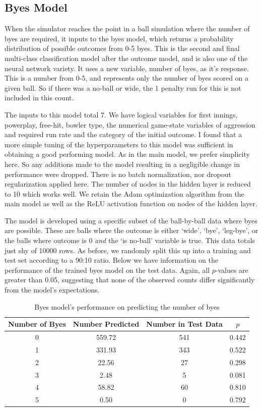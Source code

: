 \subsection{Byes Model}

When the simulator reaches the point in a ball simulation where the number of byes are required, it inputs to the byes model, which returns a probability distribution of possible outcomes from 0-5 byes. This is the second and final multi-class classification model after the outcome model, and is also one of the neural network variety. It uses a new variable, number of byes, as it's response. This is a number from 0-5, and represents only the number of byes scored on a given ball. So if there was a no-ball or wide, the 1 penalty run for this is not included in this count.

The inputs to this model total 7. We have logical variables for first innings, powerplay, free-hit, bowler type, the numerical game-state variables of aggression and required run rate and the category of the initial outcome. I found that a more simple tuning of the hyperparameters to this model was sufficient in obtaining a good performing model. As in the main model, we prefer simplicity here. So any additions made to the model resulting in a negligible change in performance were dropped. There is no batch normalization, nor dropout regularization applied here. The number of nodes in the hidden layer is reduced to 10 which works well. We retain the Adam optimization algorithm from the main model as well as the ReLU activation function on nodes of the hidden layer.

The model is developed using a specific subset of the ball-by-ball data where byes are possible. These are balls where the outcome is either `wide', `bye', `leg-bye', or the balls where outcome is 0 \textit{and} the `is no-ball' variable is true. This data totals just shy of 10000 rows. As before, we randomly split this up into a training and test set according to a 90:10 ratio. Below we have information on the performance of the trained byes model on the test data. Again, all $p$-values are greater than 0.05, suggesting that none of the observed counts differ significantly from the model's expectations.

\begin{table}[h]
\vspace{0.5em}
\centering
\begin{tabular} {c c c c} \toprule
    {Number of Byes} & {Number Predicted} & {Number in Test Data} & {$p$} \\ \midrule
     0 & 559.72 & 541 & 0.442 \\
     1 & 331.93 & 343 & 0.522 \\
     2 & 22.56 & 27 & 0.298 \\
     3 & 2.48 & 5 & 0.081 \\
     4 & 58.82 & 60 & 0.810 \\
     5 & 0.50 & 0 & 0.792 \\ \bottomrule
\end{tabular}
\caption{Byes model's performance on predicting the number of byes }
\label{table: byes}
\end{table}

